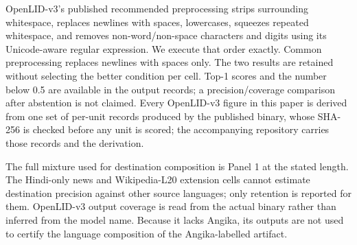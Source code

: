 
\begin{table}[htbp]\centering\small{}
\caption{OpenLID-v3 Hindi retention on the original reference cells under two preprocessing conditions. The later nested-source experiment has separate denominators.}\label{tab:modern}
\end{table}
OpenLID-v3's published recommended preprocessing strips surrounding whitespace, replaces newlines with spaces, lowercases, squeezes repeated whitespace, and removes non-word/non-space characters and digits using its Unicode-aware regular expression. We execute that order exactly. Common preprocessing replaces newlines with spaces only. The two results are retained without selecting the better condition per cell. Top-1 scores and the number below 0.5 are available in the output records; a precision/coverage comparison after abstention is not claimed. Every OpenLID-v3 figure in this paper is derived from one set of per-unit records produced by the published binary, whose SHA-256 is checked before any unit is scored; the accompanying repository carries those records and the derivation.

The full mixture used for destination composition is Panel 1 at the stated length. The Hindi-only news and Wikipedia-L20 extension cells cannot estimate destination precision against other source languages; only retention is reported for them. OpenLID-v3 output coverage is read from the actual binary rather than inferred from the model name. Because it lacks Angika, its outputs are not used to certify the language composition of the Angika-labelled artifact.
